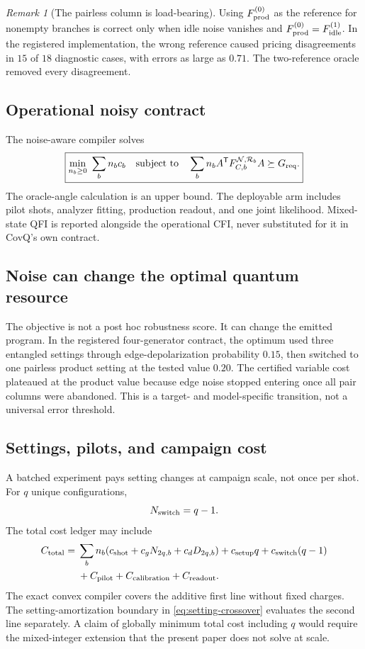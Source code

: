 \documentclass[11pt]{article}
\theoremstyle{definition}
\theoremstyle{remark}
\newtheorem{remark}[remark]{Remark}
\begin{document}
\begin{remark}[The pairless column is load-bearing]
Using $F_{\rm prod}^{(0)}$ as the reference for nonempty branches is correct only when idle noise vanishes and $F_{\rm prod}^{(0)}=F_{\rm idle}^{(1)}$. In the registered implementation, the wrong reference caused pricing disagreements in $15$ of $18$ diagnostic cases, with errors as large as $0.71$. The two-reference oracle removed every disagreement.
\end{remark}

\subsection{Operational noisy contract}
The noise-aware compiler solves
\begin{equation}
\boxed{
  \min_{n_b\ge0}\ \sum_b n_bc_b
  \quad\text{subject to}\quad
  \sum_b n_b A^{\mathsf T}F_{C,b}^{\mathcal N,\mathcal R_b}A
  \succeq G_{\rm req}.}
  \label{eq:noise-objective}
\end{equation}
The oracle-angle calculation is an upper bound. The deployable arm includes pilot shots, analyzer fitting, production readout, and one joint likelihood. Mixed-state QFI is reported alongside the operational CFI, never substituted for it in CovQ's own contract.

\subsection{Noise can change the optimal quantum resource}
The objective is not a post hoc robustness score. It can change the emitted program. In the registered four-generator contract, the optimum used three entangled settings through edge-depolarization probability $0.15$, then switched to one pairless product setting at the tested value $0.20$. The certified variable cost plateaued at the product value because edge noise stopped entering once all pair columns were abandoned. This is a target- and model-specific transition, not a universal error threshold.

\subsection{Settings, pilots, and campaign cost}
A batched experiment pays setting changes at campaign scale, not once per shot. For $q$ unique configurations,
\begin{equation}
  N_{\rm switch}=q-1.
\end{equation}
The total cost ledger may include
\begin{align}
  C_{\rm total}={}&
  \sum_b n_b\!
  \left(c_{\rm shot}+c_gN_{2q,b}+c_dD_{2q,b}\right)
  +c_{\rm setup}q+c_{\rm switch}(q-1)\notag\\
  &+C_{\rm pilot}+C_{\rm calibration}+C_{\rm readout}.
  \label{eq:campaign-cost}
\end{align}
The exact convex compiler covers the additive first line without fixed charges. The setting-amortization boundary in \cref{eq:setting-crossover} evaluates the second line separately. A claim of globally minimum total cost including $q$ would require the mixed-integer extension that the present paper does not solve at scale.
\end{document}
